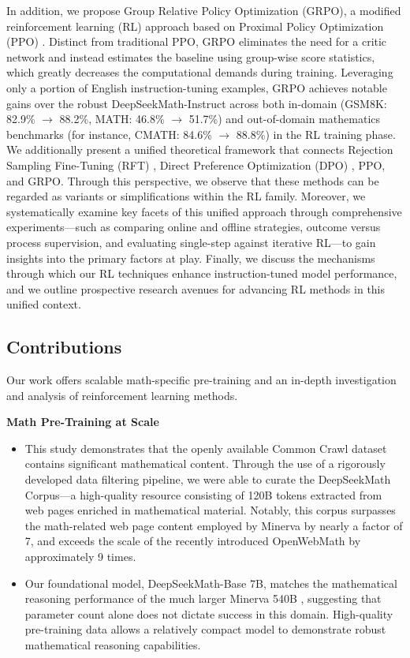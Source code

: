 In addition, we propose Group Relative Policy Optimization (GRPO), a modified reinforcement learning (RL) approach based on Proximal Policy Optimization (PPO) \citep{schulman2017proximal}. Distinct from traditional PPO, GRPO eliminates the need for a critic network and instead estimates the baseline using group-wise score statistics, which greatly decreases the computational demands during training. Leveraging only a portion of English instruction-tuning examples, GRPO achieves notable gains over the robust DeepSeekMath-Instruct across both in-domain (GSM8K: 82.9\% $\rightarrow$ 88.2\%, MATH: 46.8\% $\rightarrow$ 51.7\%) and out-of-domain mathematics benchmarks (for instance, CMATH: 84.6\% $\rightarrow$ 88.8\%) in the RL training phase. We additionally present a unified theoretical framework that connects Rejection Sampling Fine-Tuning (RFT) \citep{yuan2023scaling}, Direct Preference Optimization (DPO) \citep{dpo}, PPO, and GRPO. Through this perspective, we observe that these methods can be regarded as variants or simplifications within the RL family. Moreover, we systematically examine key facets of this unified approach through comprehensive experiments—such as comparing online and offline strategies, outcome versus process supervision, and evaluating single-step against iterative RL—to gain insights into the primary factors at play. Finally, we discuss the mechanisms through which our RL techniques enhance instruction-tuned model performance, and we outline prospective research avenues for advancing RL methods in this unified context.

\subsection{Contributions}
Our work offers scalable math-specific pre-training and an in-depth investigation and analysis of reinforcement learning methods.

\textbf{Math Pre-Training at Scale}

\begin{itemize}[topsep=0pt]
    \item This study demonstrates that the openly available Common Crawl dataset contains significant mathematical content. Through the use of a rigorously developed data filtering pipeline, we were able to curate the DeepSeekMath Corpus—a high-quality resource consisting of 120B tokens extracted from web pages enriched in mathematical material. Notably, this corpus surpasses the math-related web page content employed by Minerva \citep{minerva} by nearly a factor of 7, and exceeds the scale of the recently introduced OpenWebMath \citep{openwebmath} by approximately 9 times.

    \item Our foundational model, DeepSeekMath-Base 7B, matches the mathematical reasoning performance of the much larger Minerva 540B \citep{minerva}, suggesting that parameter count alone does not dictate success in this domain. High-quality pre-training data allows a relatively compact model to demonstrate robust mathematical reasoning capabilities.
\end{itemize}

